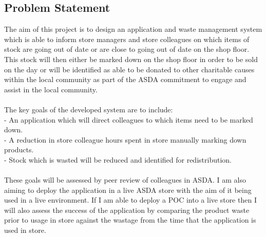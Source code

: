 \documentclass[a4paper,11pt]{report}
\begin{document}
\subsection{Problem Statement}\label{sec:problem}
The aim of this project is to design an application and waste management system which is able
to inform store managers and store colleagues on which items of stock are going out of date or are
close to going out of date on the shop floor. This stock will then either be marked 
down on the shop floor in order to be sold on the day or will be identified as able to be donated to other charitable
causes within the local community as part of the ASDA commitment to engage and assist in the local community.
\\
\\
The key goals of the developed system are to include:
\\
- An application which will direct colleagues to which items need to be marked down.
\\
- A reduction in store colleague hours spent in store manually marking down products.
\\
- Stock which is wasted will be reduced and identified for redistribution.
\\
\\
These goals will be assessed by peer review of colleagues in ASDA. I am also aiming to 
deploy the application in a live ASDA store with the aim of it being used in a live environment.
If I am able to deploy a POC into a live store then I will also assess the success of the 
application by comparing the product waste prior to usage in store against the wastage from 
the time that the application is used in store. 
\end{document}
